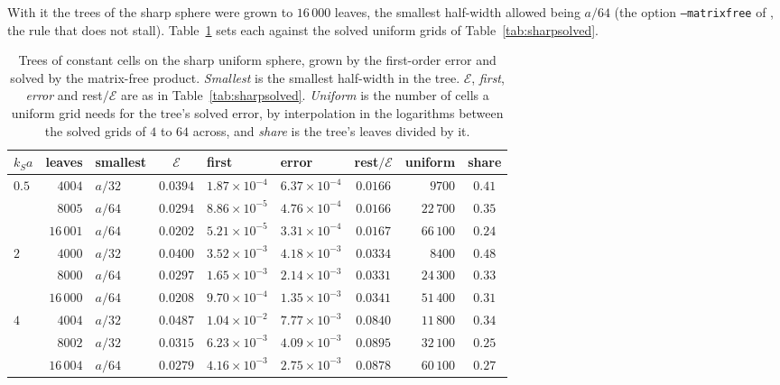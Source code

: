 \documentclass[11pt,a4paper]{article}
\newcommand{\cE}{\mathcal{E}}
\begin{document}
With it the trees of the sharp sphere were grown to $16\,000$ leaves, the smallest half-width allowed
being $a/64$ (the option \texttt{--matrixfree} of , the
rule that does not stall). Table~\ref{tab:treesfree} sets each against the solved uniform grids of
Table~\ref{tab:sharpsolved}.
\begin{table}[htbp]
\centering
\caption{Trees of constant cells on the sharp uniform sphere, grown by the first-order error and solved
by the matrix-free product. \emph{Smallest} is the smallest half-width in the tree. $\cE$, \emph{first},
\emph{error} and rest$/\cE$ are as in Table~\ref{tab:sharpsolved}. \emph{Uniform} is the number of cells
a uniform grid needs for the tree's solved error, by interpolation in the logarithms between the solved
grids of $4$ to $64$ across, and \emph{share} is the tree's leaves divided by it.}\label{tab:treesfree}
\small
\begin{tabular}{@{}lrlcllcrc@{}}
\toprule
$k_Sa$ & leaves & smallest & $\cE$ & first & error & rest$/\cE$ & uniform & share \\
\midrule
$0.5$ & $4004$     & $a/32$ & $0.0394$ & $1.87\times10^{-4}$ & $6.37\times10^{-4}$ & $0.0166$ & $9700$     & $0.41$ \\
      & $8005$     & $a/64$ & $0.0294$ & $8.86\times10^{-5}$ & $4.76\times10^{-4}$ & $0.0166$ & $22\,700$ & $0.35$ \\
      & $16\,001$  & $a/64$ & $0.0202$ & $5.21\times10^{-5}$ & $3.31\times10^{-4}$ & $0.0167$ & $66\,100$ & $0.24$ \\
\midrule
$2$   & $4000$     & $a/32$ & $0.0400$ & $3.52\times10^{-3}$ & $4.18\times10^{-3}$ & $0.0334$ & $8400$     & $0.48$ \\
      & $8000$     & $a/64$ & $0.0297$ & $1.65\times10^{-3}$ & $2.14\times10^{-3}$ & $0.0331$ & $24\,300$ & $0.33$ \\
      & $16\,000$  & $a/64$ & $0.0208$ & $9.70\times10^{-4}$ & $1.35\times10^{-3}$ & $0.0341$ & $51\,400$ & $0.31$ \\
\midrule
$4$   & $4004$     & $a/32$ & $0.0487$ & $1.04\times10^{-2}$ & $7.77\times10^{-3}$ & $0.0840$ & $11\,800$ & $0.34$ \\
      & $8002$     & $a/32$ & $0.0315$ & $6.23\times10^{-3}$ & $4.09\times10^{-3}$ & $0.0895$ & $32\,100$ & $0.25$ \\
      & $16\,004$  & $a/64$ & $0.0279$ & $4.16\times10^{-3}$ & $2.75\times10^{-3}$ & $0.0878$ & $60\,100$ & $0.27$ \\
\bottomrule
\end{tabular}
\end{table}
\end{document}
